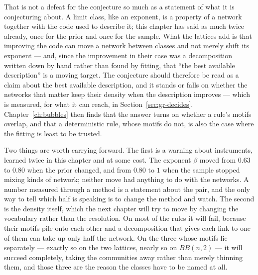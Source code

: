 That is not a defeat for the conjecture so much as a statement of what it is
conjecturing about. A limit class, like an exponent, is a property of a network
together with the code used to describe it; this chapter has said as much twice
already, once for the prior and once for the sample. What the lattices add is that
improving the code can move a network between classes and not merely shift its
exponent --- and, since the improvement in their case was a decomposition written
down by hand rather than found by fitting, that ``the best available
description'' is a moving target. The conjecture should therefore be read as a claim about the best
available description, and it stands or falls on whether the networks that matter
keep their density when the description improves --- which is measured, for what
it can reach, in Section~\ref{sec:gr-decides}. Chapter~\ref{ch:bubbles} then
finds that the answer turns on whether a rule's motifs overlap, and that a
deterministic rule, whose motifs do not, is also the case where the fitting is
least to be trusted.

Two things are worth carrying forward. The first is a warning about instruments,
learned twice in this chapter and at some cost. The exponent $\beta$ moved from
$0.63$ to $0.80$ when the prior changed, and from $0.80$ to $1$ when the sample
stopped mixing kinds of network; neither move had anything to do with the
networks. A number measured through a method is a statement about the pair, and
the only way to tell which half is speaking is to change the method and watch.
The second is the density itself, which the next chapter will try to move by
changing the vocabulary rather than the resolution. On most of the rules it will
fail, because their motifs pile onto each other and a decomposition that gives
each link to one of them can take up only half the network. On the three whose
motifs lie separately --- exactly so on the two lattices, nearly so on
$BB(n,2)$ --- it will succeed completely, taking the communities away rather than
merely thinning them, and those three are the reason the classes have to be named
at all.
